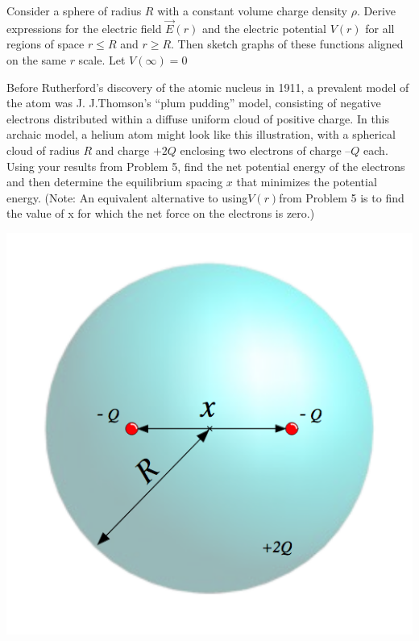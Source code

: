 \documentclass[11pt,letterpaper,boxed]{hmcpset}
\begin{document}
\begin{problem}[5]
Consider a sphere of radius $R$ with a constant volume charge density $\rho$. Derive expressions for the electric field $ \vec{E}(r)$ and the electric potential $V(r)$ for all regions of space $r \leq R$ and $r \geq R$. Then sketch graphs of these functions aligned on the same $r$ scale. Let $V (\infty) = 0$
\end{problem}

\begin{solution}
\vfill
\end{solution}
\newpage

\begin{problem}[HRK E29.29]
Before Rutherford’s discovery of the atomic nucleus in 
1911, a prevalent model of the atom was J. J.Thomson’s ``plum pudding” model, consisting of negative electrons  distributed within a  diffuse uniform cloud of positive charge.  In this archaic model, a helium atom might look like this illustration, with a spherical cloud of radius $R$ and charge $+2Q$ enclosing two electrons of charge $–Q$ each. Using your results from Problem 5, find the net potential energy of the electrons and then determine the equilibrium spacing $x$ that minimizes the potential energy.  (Note:  An equivalent alternative to using$V(r)$from Problem 5 is to find the value of x for which the net force on the electrons is zero.) 
\begin{center}
\includegraphics[scale=0.6]{Rutherford.png}
\end{center}
\end{problem}

\begin{solution}
\vfill
\end{solution}
\end{document}
